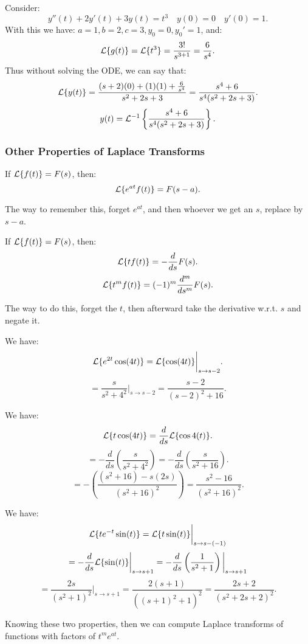 \documentclass[../main/main.tex]{subfiles}
\begin{document}
\begin{example}
	Consider: \[
		y''(t) + 2y'(t) + 3y(t) = t^3\quad y(0) = 0 \quad y'(0) = 1
	.\] With this we have: $a=1,b=2,c=3,y_0=0,y_0'=1$, and: \[
	\mathcal{L} \{g(t)\} =\mathcal{L} \{t ^{3} \} = \frac{3!}{s^{3+1}} = \frac{6}{s^{4}}
	.\] Thus without solving the ODE, we can say that: \[
	\mathcal{L} \{y(t) \} = \frac{(s+2)(0)+(1)(1)+\frac{6}{s^{4}}}{s^2+2s+3} = \frac{s^{4}+6}{s^{4}(s^2+2s+3)}
	.\] \[
	y(t) = \mathcal{L} ^{-1}\left\{ \frac{s^{4}+6}{s^{4}(s^2+2s+3)}\right\}
	.\] 
\end{example}
\subsubsection{Other Properties of Laplace Transforms}
\begin{theorem}
	If $\mathcal{L} \{f(t)\} =F(s)$, then: \[
		\mathcal{L} \{e^{at}f(t)\} =F(s-a)
	.\] 
\end{theorem}
\begin{remark}
	The way to remember this, forget $e^{a t}$, and then whoever we get an $s$, replace by $s-a$.
\end{remark}
\begin{theorem}
	If $\mathcal{L} \{f(t)\} =F(s)$, then: \[
		\mathcal{L} \{tf(t)\} = - \frac{d}{ds}F(s)
	.\] \[
	\mathcal{L} \{t ^{m}f(t)\} = (-1)^{m} \frac{d^{m}}{ds^{m}}F(s)
	.\] 
	\end{theorem}
	\begin{remark}
		The way to do this, forget the $t$, then afterward take the derivative w.r.t. $s$ and negate it.
	\end{remark}
\begin{example}
	We have: \[
		\mathcal{L} \{e^{2t}\cos(4t)\} =\mathcal{L} \{\cos(4t)\} \bigg\rvert_{s\to s-2}
	.\] \[
=\frac{s}{s^2+4^2}\bigg\rvert_{s\to s-2} = \frac{s-2}{(s-2)^{2}+16}
	.\] 
\end{example}
\begin{example}
We have: \[
	\mathcal{L} \{t \cos(4t)\}  = \frac{d}{ds}\mathcal{L} \{\cos 4(t)\} 
.\] 	\[
=-\frac{d}{ds}\left( \frac{s}{s^2+4^2} \right) =-\frac{d}{ds}\left( \frac{s}{s^2+16} \right) 
.\] \[
=-\left( \frac{\left( s^2+16 \right)-s(2s) }{\left( s^2+16 \right) ^2} \right) =\frac{s^2-16}{(s^2+16)^2}
.\] 
\end{example}
\begin{example}
We have: \[
\mathcal{L} \{t e^{-t}\sin(t)\} =\mathcal{L} \{t \sin(t)\} \bigg\rvert_{s\to s-(-1)}
\] 	\[
=-\frac{d}{ds}\mathcal{L} \{\sin(t)\} \bigg\rvert_{s\to s+1}= - \frac{d}{ds}\left( \frac{1}{s^2+1} \right) \bigg\rvert_{s\to s+1}
\] \[
=\frac{2s}{(s^2+1)^2}\bigg\vert_{s\to s+1}= \frac{2(s+1)}{\left( (s+1)^2+1 \right) ^2}= \frac{2s+2}{\left( s^2+2s+2 \right) ^2}
.\] 
\end{example}
\begin{remark}
	Knowing these two properties, then we can compute Laplace transforms of functions with factors of $t ^{m}e^{at}$.
\end{remark}
\end{document}
